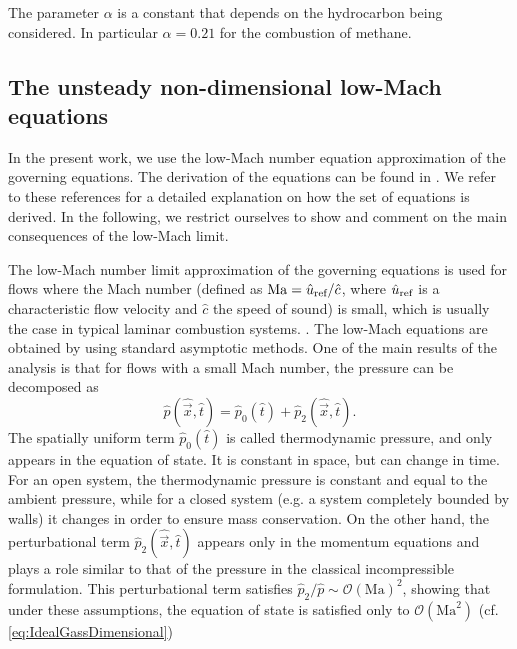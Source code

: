 The parameter $\alpha$ is a constant that depends on the hydrocarbon being considered. In particular $\alpha = 0.21$ for the combustion of methane.

\subsection{The unsteady non-dimensional low-Mach equations} \label{ssec:NonDimLowMachEquations}

In the present work, we use the low-Mach number equation approximation of the governing equations. The derivation of the equations can be found in \citep{rehmEquationsMotionThermally1978, majdaDerivationNumericalSolution1985,mullerLowMachNumberAsymptoticsNavierStokes1998a}. We refer to these references for a detailed explanation on how the set of equations is derived. In the following, we restrict ourselves to show and comment on the main consequences of the low-Mach limit.

The low-Mach number limit approximation of the governing equations is used for flows where the Mach number (defined as $\text{Ma} = \hat u_{\text{ref}}/\hat c$, where $\hat u_{\text{ref}}$ is a characteristic flow velocity and $\hat{c}$ the speed of sound) is small, which is usually the case in typical laminar combustion systems. \citep{dobbinsFullyImplicitCompact2010}. 
The low-Mach equations are obtained by using standard asymptotic methods. One of the main results of the analysis is that for flows with a small Mach number, the pressure can be decomposed as 
\begin{equation}
    \hat p(\hat {\vec{x}}, \hat t) = \hat p_0(\hat t) + \hat p_2(\hat{\vec{x}},\hat t). 
\end{equation}
The spatially uniform term $\hat p_0(\hat t)$ is called thermodynamic pressure, and only appears in the equation of state. It is constant in space, but can change in time.  For an open system, the thermodynamic pressure is constant and equal to the ambient pressure, while for a closed system (e.g. a system completely bounded by walls) it changes in order to ensure mass conservation.%
On the other hand, the perturbational term $\hat p_2(\hat{\vec{x}},\hat t)$ appears only in the momentum equations and plays a role similar to that of the pressure in the classical incompressible formulation. This perturbational term satisfies $\hat p_2/\hat p \sim \mathcal{O}(\text{Ma})^2$, \citep{dobbinsFullyImplicitCompact2010,nonakaConservativeThermodynamicallyConsistent2018} showing that under these assumptions, the equation of state is satisfied only to $\mathcal{O}(\text{Ma}^2)$ (cf.  \cref{eq:IdealGassDimensional}) 

